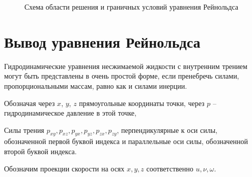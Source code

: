 \documentclass[12pt, a4paper]{article}
\begin{document}
\begin{figure}[!htbp]
	\caption{Схема области решения и граничных условий уравнения Рейнольдса}
	\label{obl_resh}
\end{figure}

\section{Вывод уравнения Рейнольдса}

Гидродинамические уравнения несжимаемой жидкости с
внутренним трением могут быть представлены в очень простой
форме, если пренебречь силами, пропорциональными массам,
равно как и силами инерции.

Обозначая через $x$, $y$, $z$ прямоугольные координаты точки, через $p$ -- гидродинамическое давление в этой точке,

Силы трения $p_{xy}, p_{xz}, p_{yx}, p_{yz}, p_{zx}, p_{zy}$, перпендикулярные к оси силы, обозначенной первой буквой индекса и параллельные оси силы, обозначенной второй буквой индекса.

Обозначим проекции скорости на осях $x, y, z \text{ соответственно}$ $u, \nu, \omega$.
\end{document}
